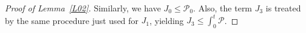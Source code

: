 \documentclass[10pt,reqno]{amsart}
\theoremstyle{plain}
\theoremstyle{definition}
\numberwithin{equation}{section}
\newcommand{\ccP}{\mathscr{P}}
\newcommand{\ccPz}{\mathscr{P}_0}
\newcommand{\Ga}{\Gamma}
\newcommand{\Om}{\Omega}
\newcommand{\norm}[1]{\Vert#1\Vert}
\begin{document}
\begin{proof}[Proof of Lemma~\ref{L02}]
Similarly, we have
$J_0\leq \ccPz$.
Also, the term $J_3$ is treated by the same procedure just used for $J_1$,
yielding
$J_3\leq \int_{0}^{t}\ccP$.


\end{proof}
\end{document}
